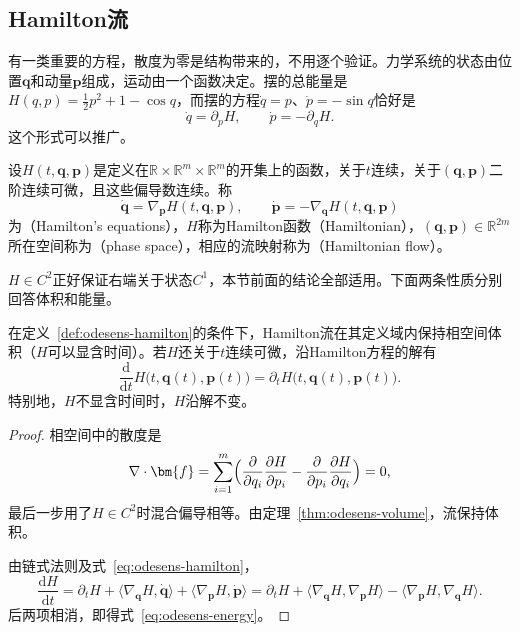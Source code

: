 \subsection{Hamilton流}
\label{sec:odesens-hamilton}

有一类重要的方程，散度为零是结构带来的，不用逐个验证。力学系统的状态由位置$\bm{q}$和动量$\bm{p}$组成，运动由一个函数决定。摆的总能量是$H(q,p)=\tfrac12p^2+1-\cos q$，而摆的方程$\dot{q}=p$、$\dot{p}=-\sin q$恰好是
\[
 \dot{q}=\partial_pH,\qquad \dot{p}=-\partial_qH.
\]
这个形式可以推广。

\begin{definition}[Hamilton方程]
\label{def:odesens-hamilton}
设$H(t,\bm{q},\bm{p})$是定义在$\mathbb{R}\times\mathbb{R}^{m}\times\mathbb{R}^{m}$的开集上的函数，关于$t$连续，关于$(\bm{q},\bm{p})$二阶连续可微，且这些偏导数连续。称
\begin{equation}
 \dot{\bm{q}}=\nabla_{\bm{p}}H(t,\bm{q},\bm{p}),\qquad
 \dot{\bm{p}}=-\nabla_{\bm{q}}H(t,\bm{q},\bm{p})
 \label{eq:odesens-hamilton}
\end{equation}
为（Hamilton's equations），$H$称为Hamilton函数（Hamiltonian），$(\bm{q},\bm{p})\in\mathbb{R}^{2m}$所在空间称为（phase space），相应的流映射称为（Hamiltonian flow）。
\end{definition}

$H\in C^2$正好保证右端关于状态$C^1$，本节前面的结论全部适用。下面两条性质分别回答体积和能量。

\begin{theorem}[Hamilton流的体积与能量]
\label{thm:odesens-hamilton}
在定义~\ref{def:odesens-hamilton}的条件下，Hamilton流在其定义域内保持相空间体积（$H$可以显含时间）。若$H$还关于$t$连续可微，沿Hamilton方程的解有
\begin{equation}
 \frac{\mathrm{d}}{\mathrm{d}t}H\bigl(t,\bm{q}(t),\bm{p}(t)\bigr)=\partial_tH\bigl(t,\bm{q}(t),\bm{p}(t)\bigr).
 \label{eq:odesens-energy}
\end{equation}
特别地，$H$不显含时间时，$H$沿解不变。
\end{theorem}

\begin{proof}
相空间中的散度是
\[
 \nabla\cdot\bm{f}=\sum_{i=1}^{m}\Bigl(\frac{\partial}{\partial q_i}\frac{\partial H}{\partial p_i}-\frac{\partial}{\partial p_i}\frac{\partial H}{\partial q_i}\Bigr)=0,
\]
最后一步用了$H\in C^2$时混合偏导相等。由定理~\ref{thm:odesens-volume}，流保持体积。

由链式法则及式~\eqref{eq:odesens-hamilton}，
\[
 \frac{\mathrm{d}H}{\mathrm{d}t}=\partial_tH+\langle\nabla_{\bm{q}}H,\dot{\bm{q}}\rangle+\langle\nabla_{\bm{p}}H,\dot{\bm{p}}\rangle=\partial_tH+\langle\nabla_{\bm{q}}H,\nabla_{\bm{p}}H\rangle-\langle\nabla_{\bm{p}}H,\nabla_{\bm{q}}H\rangle.
\]
后两项相消，即得式~\eqref{eq:odesens-energy}。
\end{proof}

